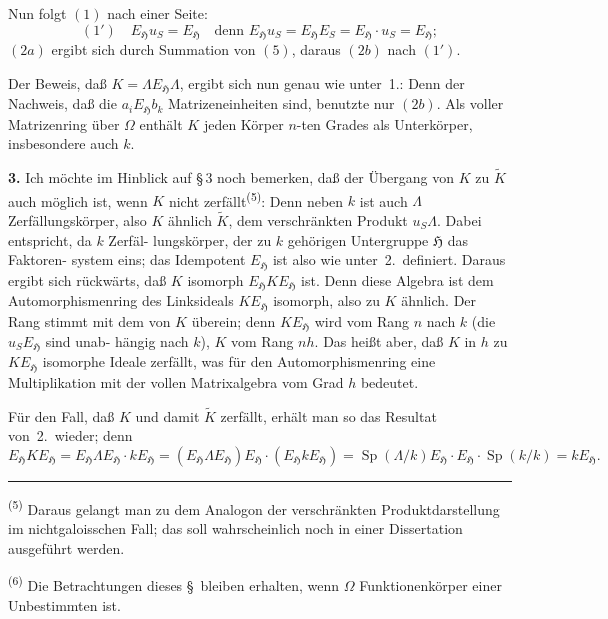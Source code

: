 \documentclass[12pt,a4paper]{article}
\theoremstyle{plain}
\DeclareMathOperator{\Sp}{Sp}
\begin{document}
Nun folgt $(1)$ nach einer Seite:
\[
(1') \quad E_{\mathfrak{H}} u_S = E_{\mathfrak{H}} \quad \text{denn } E_{\mathfrak{H}} u_S = E_{\mathfrak{H}} E_S = E_{\mathfrak{H}} \cdot u_S = E_{\mathfrak{H}};
\]
$(2a)$ ergibt sich durch Summation von $(5)$, daraus $(2b)$ nach $(1')$.

Der Beweis, da\ss{} $K = \Lambda E_{\mathfrak{H}} \Lambda$, ergibt sich nun genau wie unter~1.:
Denn der Nachweis, da\ss{} die $a_i E_{\mathfrak{H}} b_k$ Matrizeneinheiten sind,
benutzte nur $(2b)$. Als voller Matrizenring \"uber $\Omega$ enth\"alt $K$ jeden
K\"orper $n$-ten Grades als Unterk\"orper, insbesondere auch $k$.

\medskip
\noindent\textbf{3.}\hspace{0.5em}%
Ich m\"ochte im Hinblick auf \S\,3 noch bemerken, da\ss{} der
\"Ubergang von $K$ zu $\tilde{K}$ auch m\"oglich ist, wenn $K$ nicht zerf\"allt\textsuperscript{(5)}:
Denn neben $k$ ist auch $\Lambda$ Zerf\"allungsk\"orper, also $K$ \"ahnlich $\tilde{K}$, dem
verschr\"ankten Produkt $u_S \Lambda$. Dabei entspricht, da $k$ Zerf\"al-
lungsk\"orper, der zu $k$ geh\"origen Untergruppe $\mathfrak{H}$ das Faktoren-
system eins; das Idempotent $E_{\mathfrak{H}}$ ist also wie unter~2.\ definiert.
Daraus ergibt sich r\"uckw\"arts, da\ss{} $K$ isomorph $E_{\mathfrak{H}} K E_{\mathfrak{H}}$ ist. Denn
diese Algebra ist dem Automorphismenring des Linksideals
$K E_{\mathfrak{H}}$ isomorph, also zu $K$ \"ahnlich. Der Rang stimmt mit dem von $K$
\"uberein; denn $K E_{\mathfrak{H}}$ wird vom Rang $n$ nach $k$ (die $u_S E_{\mathfrak{H}}$ sind unab-
h\"angig nach $k$), $K$ vom Rang $nh$. Das hei\ss t aber, da\ss{} $K$ in $h$ zu
$K E_{\mathfrak{H}}$ isomorphe Ideale zerf\"allt, was f\"ur den Automorphismenring
eine Multiplikation mit der vollen Matrixalgebra vom Grad $h$
bedeutet.

F\"ur den Fall, da\ss{} $K$ und damit $\tilde{K}$ zerf\"allt, erh\"alt man so das
Resultat von~2.\ wieder; denn
\[
E_{\mathfrak{H}} K E_{\mathfrak{H}} = E_{\mathfrak{H}} \Lambda E_{\mathfrak{H}} \cdot k E_{\mathfrak{H}}
= (E_{\mathfrak{H}} \Lambda E_{\mathfrak{H}}) E_{\mathfrak{H}} \cdot (E_{\mathfrak{H}} k E_{\mathfrak{H}})
= \Sp(\Lambda/k) E_{\mathfrak{H}} \cdot E_{\mathfrak{H}} \cdot \Sp(k/k) = k E_{\mathfrak{H}}.
\]

\bigskip
\noindent\rule{0.3\textwidth}{0.4pt}

{\small
\textsuperscript{(5)} Daraus gelangt man zu dem Analogon der verschr\"ankten Produktdarstellung
im nichtgaloisschen Fall; das soll wahrscheinlich noch in einer Dissertation
ausgef\"uhrt werden.

\textsuperscript{(6)} Die Betrachtungen dieses \S\ bleiben erhalten, wenn $\Omega$ Funktionenk\"orper
einer Unbestimmten ist.
}
\end{document}
